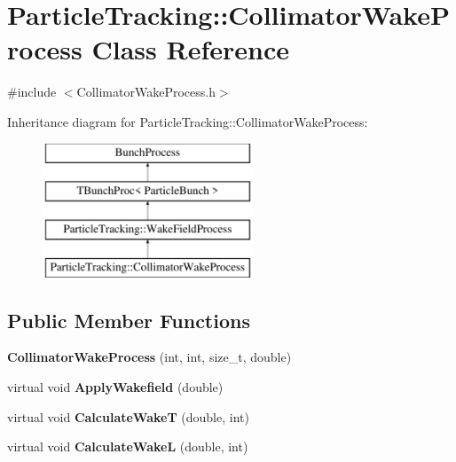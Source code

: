 \hypertarget{classParticleTracking_1_1CollimatorWakeProcess}{}\section{Particle\+Tracking\+:\+:Collimator\+Wake\+Process Class Reference}
\label{classParticleTracking_1_1CollimatorWakeProcess}


{\ttfamily \#include $<$Collimator\+Wake\+Process.\+h$>$}

Inheritance diagram for Particle\+Tracking\+:\+:Collimator\+Wake\+Process\+:\begin{figure}[H]
\begin{center}
\leavevmode
\includegraphics[height=4.000000cm]{classParticleTracking_1_1CollimatorWakeProcess}
\end{center}
\end{figure}
\subsection*{Public Member Functions}
\begin{DoxyCompactItemize}
\item 
\mbox{\label{classParticleTracking_1_1CollimatorWakeProcess_a1687e6bd771ce5e53248951e5a9594a7}} 
{\bfseries Collimator\+Wake\+Process} (int, int, size\+\_\+t, double)
\item 
\mbox{\label{classParticleTracking_1_1CollimatorWakeProcess_a7506091d0d9a7c42a197e9d5142e7d7e}} 
virtual void {\bfseries Apply\+Wakefield} (double)
\item 
\mbox{\label{classParticleTracking_1_1CollimatorWakeProcess_a9e82c6f3737bb7a27f9ed008494d7d83}} 
virtual void {\bfseries Calculate\+WakeT} (double, int)
\item 
\mbox{\label{classParticleTracking_1_1CollimatorWakeProcess_ac2d3d936f632db178288b64877e08231}} 
virtual void {\bfseries Calculate\+WakeL} (double, int)
\end{DoxyCompactItemize}
